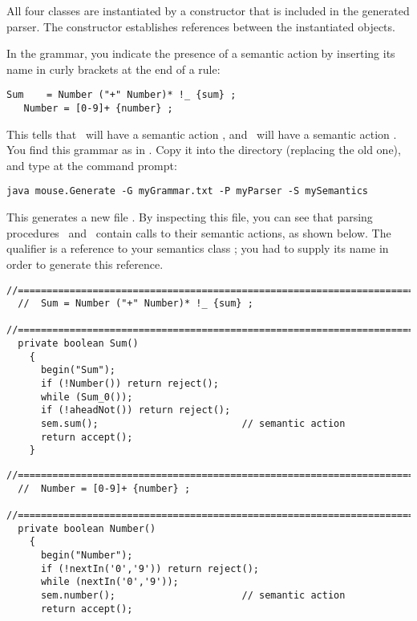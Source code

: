 All four classes are instantiated by a constructor
that is included in the generated parser.
The constructor establishes references between the
instantiated objects.

In the grammar, you indicate the presence of a semantic action by inserting its name in curly brackets
at the end of a rule:

\smallskip 
\small
\begin{Verbatim}[frame=single,framesep=2mm,samepage=true,xleftmargin=15mm,xrightmargin=15mm,baselinestretch=0.8]
   Sum    = Number ("+" Number)* !_ {sum} ;
   Number = [0-9]+ {number} ;
\end{Verbatim}
\normalsize
 
This tells that \Sum\ will have a semantic action \Suma,
and \Number\ will have a semantic action \Numbera.
You find this grammar as  in .
Copy it into the  directory (replacing the old one),
and type at the command prompt:

\small
\begin{Verbatim}[samepage=true,xleftmargin=15mm,baselinestretch=0.8]
 java mouse.Generate -G myGrammar.txt -P myParser -S mySemantics
\end{Verbatim}
\normalsize

This generates a new file .
By inspecting this file,
you can see that parsing procedures \Sumb\
and \Numberb\ contain calls to their semantic actions, as shown below.
The qualifier \tx{sem} is a reference to your semantics class ;
you had to supply its name in order to generate this reference.

\small
\begin{Verbatim}[frame=single,framesep=2mm,samepage=true,xleftmargin=15mm,xrightmargin=15mm,baselinestretch=0.8]
  //=====================================================================
  //  Sum = Number ("+" Number)* !_ {sum} ;
  //=====================================================================
  private boolean Sum()
    {
      begin("Sum");
      if (!Number()) return reject();
      while (Sum_0());
      if (!aheadNot()) return reject();
      sem.sum();                         // semantic action
      return accept();
    }
\end{Verbatim}
\normalsize

\small
\begin{Verbatim}[frame=single,framesep=2mm,samepage=true,xleftmargin=15mm,xrightmargin=15mm,baselinestretch=0.8]
  //=====================================================================
  //  Number = [0-9]+ {number} ;
  //=====================================================================
  private boolean Number()
    {
      begin("Number");
      if (!nextIn('0','9')) return reject();
      while (nextIn('0','9'));
      sem.number();                      // semantic action
      return accept();
\end{Verbatim}
\normalsize

